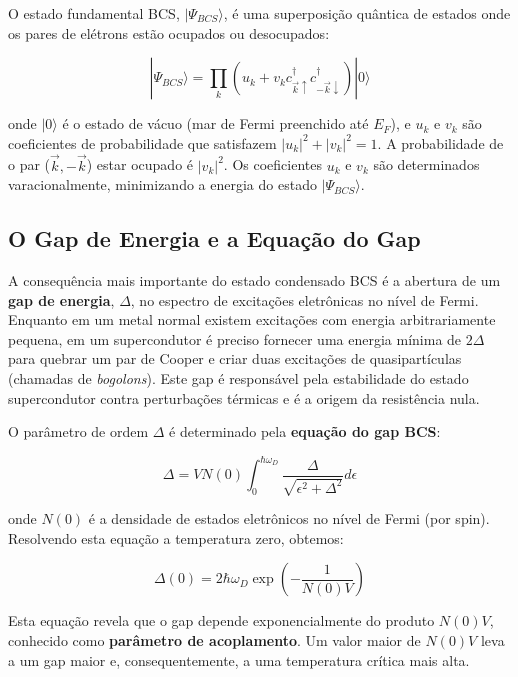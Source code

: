 \documentclass[12pt, a4paper, oneside]{report}
\begin{document}
O estado fundamental BCS, $|\Psi_{BCS}\rangle$, é uma superposição quântica de estados onde os pares de elétrons estão ocupados ou desocupados:

\begin{equation}
    |\Psi_{BCS}\rangle = \prod_k (u_k + v_k c_{\vec{k}\uparrow}^\dagger c_{-\vec{k}\downarrow}^\dagger) |0\rangle
\end{equation}

onde $|0\rangle$ é o estado de vácuo (mar de Fermi preenchido até $E_F$), e $u_k$ e $v_k$ são coeficientes de probabilidade que satisfazem $|u_k|^2 + |v_k|^2 = 1$. A probabilidade de o par ($\vec{k}, -\vec{k}$) estar ocupado é $|v_k|^2$. Os coeficientes $u_k$ e $v_k$ são determinados varacionalmente, minimizando a energia do estado $|\Psi_{BCS}\rangle$.

\subsection{O Gap de Energia e a Equação do Gap}

A consequência mais importante do estado condensado BCS é a abertura de um \textbf{gap de energia}, $\Delta$, no espectro de excitações eletrônicas no nível de Fermi. Enquanto em um metal normal existem excitações com energia arbitrariamente pequena, em um supercondutor é preciso fornecer uma energia mínima de $2\Delta$ para quebrar um par de Cooper e criar duas excitações de quasipartículas (chamadas de \textit{bogolons}). Este gap é responsável pela estabilidade do estado supercondutor contra perturbações térmicas e é a origem da resistência nula.

O parâmetro de ordem $\Delta$ é determinado pela \textbf{equação do gap BCS}:

\begin{equation}
    \Delta = V N(0) \int_0^{\hbar \omega_D} \frac{\Delta}{\sqrt{\epsilon^2 + \Delta^2}} d\epsilon
\end{equation}

onde $N(0)$ é a densidade de estados eletrônicos no nível de Fermi (por spin). Resolvendo esta equação a temperatura zero, obtemos:

\begin{equation}
    \Delta(0) = 2 \hbar \omega_D \exp\left(-\frac{1}{N(0)V}\right)
\end{equation}

Esta equação revela que o gap depende exponencialmente do produto $N(0)V$, conhecido como \textbf{parâmetro de acoplamento}. Um valor maior de $N(0)V$ leva a um gap maior e, consequentemente, a uma temperatura crítica mais alta.
\end{document}
